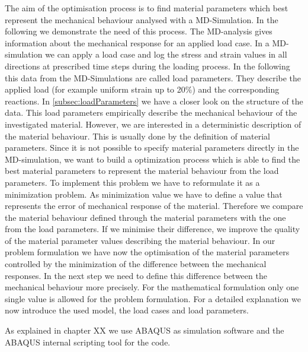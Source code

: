     The aim of the optimisation process is to find material parameters which best represent the mechanical behaviour analysed with a MD-Simulation. In the following we demonstrate the need of this process.
    The MD-analysis gives information about the mechanical response for an applied load case. In a MD-simulation we can apply a load case and log the stress and strain values in all directions at prescribed time steps during the loading process. In the following this data from the MD-Simulations are called load parameters. They describe the applied load (for example uniform strain up to 20\(\%\)) and the corresponding reactions. In \autoref{subsec:loadParameters} we have a closer look on the structure of the data. 
    This load parameters empirically describe the mechanical behaviour of the investigated material. However, we are interested in a deterministic description of the material behaviour. This is usually done by the definition of material parameters. Since it is not possible to specify material parameters directly in the MD-simulation, we want to build a optimization process which is able to find the best material parameters to represent the material behaviour from the load parameters. To implement this problem we have to reformulate it as a minimization problem. As minimization value we have to define a value that represents the error of mechanical response of the material. Therefore we compare the material behaviour defined through the material parameters with the one from the load parameters. If we minimise their difference, we improve the quality of the material parameter values describing the material behaviour. In our problem formulation we have now the optimisation of the material parameters controlled by the minimization of the difference between the mechanical responses. In the next step we need to define this difference between the mechanical behaviour more precisely. For the mathematical formulation only one single value is allowed for the problem formulation. For a detailed explanation we now introduce the used model, the load cases and load parameters.

    As explained in chapter XX we use ABAQUS as simulation software and the ABAQUS internal scripting tool for the code. 
    
    
